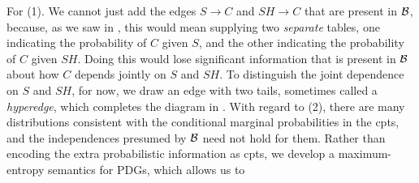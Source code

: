 \documentclass{article}
\numberwithin{equation}{section}
\begin{document}
\begin{example}[emulating a BN]
For (1). We cannot just add the edges
                $S \to C$ and $SH \to C$ that are present in $\cal B$,
                because, as we saw in , this
                would mean supplying two \emph{separate} tables, one
                indicating the probability of $C$ given $S$, and the
                other indicating the probability of $C$ given
                $\mathit{SH}$.
Doing this would lose significant information that is present in $\cal
B$  about how $C$ depends jointly on $S$ and $SH$.
		To distinguish the joint dependence on $S$ and
                $\mathit{SH}$, for now, we draw an edge with two
                tails, sometimes called a \emph{hyperedge}, which
                completes the diagram in . 
        With regard to (2), there are many
                distributions consistent with the conditional marginal
        probabilities in the cpts, and the independences presumed by
        $\cal B$ need not hold for them. Rather than encoding the
        extra probabilistic information as cpts, we develop a
        maximum-entropy semantics for PDGs, which allows us to

\end{example}
\end{document}

